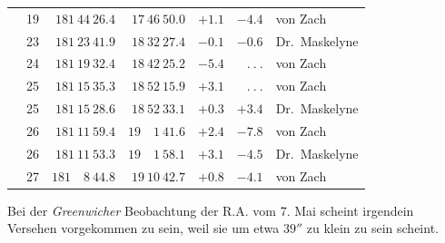 \begin{center}
{\begin{tabular}{r r|r|r|r|r|l}
&19&$181\ 44\ 26.4$&$17\ 46\ 50.0$&$+1.1$&$-4.4$&von Zach\\
&23&$181\ 23\ 41.9$&$18\ 32\ 27.4$&$-0.1$&$-0.6$&Dr.\ Maskelyne\\
&24&$181\ 19\ 32.4$&$18\ 42\ 25.2$&$-5.4$&$\ .\ .\ .$&von Zach\\
&25&$181\ 15\ 35.3$&$18\ 52\ 15.9$&$+3.1$&$\ .\ .\ .$&von Zach\\
&25&$181\ 15\ 28.6$&$18\ 52\ 33.1$&$+0.3$&$+3.4$&Dr.\ Maskelyne\\
&26&$181\ 11\ 59.4$&$19\quad1\ 41.6$&$+2.4$&$-7.8$&von Zach\\
&26&$181\ 11\ 53.3$&$19\quad1\ 58.1$&$+3.1$&$-4.5$&Dr.\ Maskelyne\\
&27&$181\quad8\ 44.8$&$19\ 10\ 42.7$&$+0.8$&$-4.1$&von Zach
\end{tabular}}
\end{center}
\expandafter\def\csname HistoricalNoteText20\endcsname{Bei der \textit{Greenwicher} Beobachtung der R.A. vom 7. Mai scheint irgendein Versehen vorgekommen zu sein, weil sie um etwa $39''$ zu klein zu sein scheint.}
%
